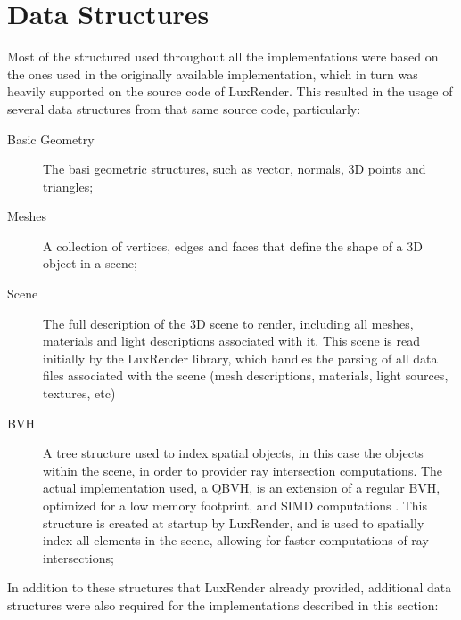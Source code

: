 \documentclass[main.tex]{subfiles}
\begin{document}
\section{Data Structures} \label{section:data_structures}


Most of the structured used throughout all the implementations were based on the ones used in the originally available implementation, which in turn was heavily supported on the source code of LuxRender. This resulted in the usage of several data structures from that same source code, particularly:

\begin{description}
\item[Basic Geometry] The basi geometric structures, such as vector, normals, 3D points and triangles;

\item[Meshes] A collection of vertices, edges and faces that define the shape of a 3D object in a scene;

\item[Scene] The full description of the 3D scene to render, including all meshes, materials and light descriptions associated with it. This scene is read initially by the LuxRender library, which handles the parsing of all data files associated with the scene (mesh descriptions, materials, light sources, textures, etc)

\item[\acl{BVH}] A tree structure used to index spatial objects, in this case the objects within the scene, in order to provider ray intersection computations. The actual implementation used, a \acf{QBVH}, is an extension of a regular \acs{BVH}, optimized for a low memory footprint, and \acs{SIMD} computations \cite{dammertz2008shallow,Stich2009hpg}. This structure is created at startup by LuxRender, and is used to spatially index all elements in the scene, allowing for faster computations of ray intersections;

\end{description}

In addition to these structures that LuxRender already provided, additional data structures were also required for the implementations described in this section:
\end{document}

